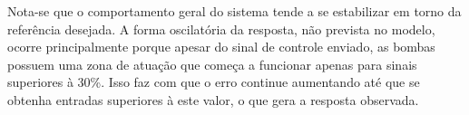 Nota-se que o comportamento geral do sistema tende a se estabilizar em torno da referência desejada. A forma oscilatória da resposta, não prevista no modelo, ocorre principalmente porque apesar do sinal de controle enviado, as bombas possuem uma zona de atuação que começa a funcionar apenas para sinais superiores à 30\%. Isso faz com que o erro continue aumentando até que se obtenha entradas superiores à este valor, o que gera a resposta observada.

%

